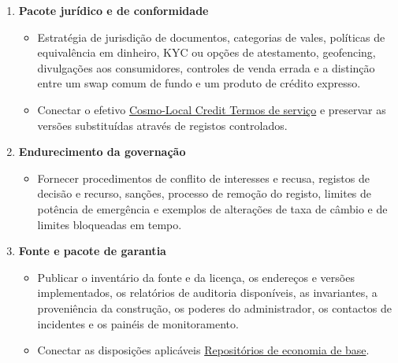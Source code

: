 \documentclass[11pt]{article}
\begin{document}
\begin{enumerate}[leftmargin=*]
\begin{itemize}[leftmargin=*]
\end{itemize}
\item \textbf{Pacote jurídico e de conformidade}
\begin{itemize}[leftmargin=*]
\item Estratégia de jurisdição de documentos, categorias de vales, políticas de equivalência em dinheiro, KYC ou opções de atestamento, geofencing, divulgações aos consumidores, controles de venda errada e a distinção entre um swap comum de fundo e um produto de crédito expresso.
\item Conectar o efetivo \href{https://docs.cosmolocal.credit/pt/governance/terms}{Cosmo-Local Credit Termos de serviço} e preservar as versões substituídas através de registos controlados.
\end{itemize}
\item \textbf{Endurecimento da governação}
\begin{itemize}[leftmargin=*]
\item Fornecer procedimentos de conflito de interesses e recusa, registos de decisão e recurso, sanções, processo de remoção do registo, limites de potência de emergência e exemplos de alterações de taxa de câmbio e de limites bloqueadas em tempo.
\end{itemize}
\item \textbf{Fonte e pacote de garantia}
\begin{itemize}[leftmargin=*]
\item Publicar o inventário da fonte e da licença, os endereços e versões implementados, os relatórios de auditoria disponíveis, as invariantes, a proveniência da construção, os poderes do administrador, os contactos de incidentes e os painéis de monitoramento.
\item Conectar as disposições aplicáveis \href{https://github.com/grassrootseconomics}{Repositórios de economia de base}.
\end{itemize}
\end{enumerate}
\end{document}
